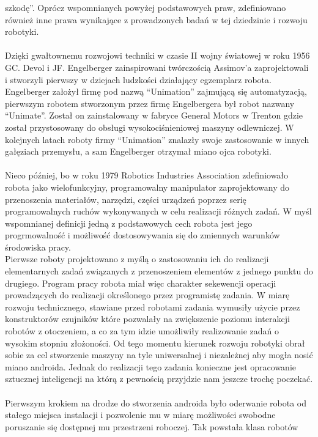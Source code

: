 szkodę''. Oprócz wspomnianych powyżej podstawowych praw, zdefiniowano również
inne prawa wynikające z prowadzonych badań w tej dziedzinie i rozwoju robotyki.\\
\\
Dzięki gwałtownemu rozwojowi techniki w czasie II wojny światowej w roku 1956
GC. Devol i JF. Engelberger zainspirowani twórczością Assimov'a zaprojektowali i
stworzyli pierwszy w dziejach ludzkości działający egzemplarz robota.
Engelberger założył firmę pod nazwą ``Unimation'' zajmującą się automatyzacją,
pierwszym robotem stworzonym przez firmę Engelbergera był robot nazwany
``Unimate''. Został on zainstalowany w fabryce General Motors w Trenton gdzie
został przystosowany do obsługi wysokociśnieniowej maszyny odlewniczej. W
kolejnych latach roboty firmy ``Unimation'' znalazły swoje zastosowanie w innych
gałęziach przemysłu, a sam Engelberger otrzymał miano ojca robotyki.\\
\\
Nieco później, bo w roku 1979 Robotics Industries Association 
zdefiniowało robota jako wielofunkcyjny, programowalny manipulator
zaprojektowany do przenoszenia materiałów, narzędzi, części urządzeń poprzez
serię programowalnych ruchów wykonywanych w celu realizacji różnych zadań.
W myśl wspomnianej definicji jedną z podstawowych cech robota jest jego
progrmowalność i możliwość dostosowywania się do zmiennych warunków środowiska
pracy. \\
Pierwsze roboty projektowano z myślą o zastosowaniu ich do realizacji
elementarnych zadań związanych z przenoszeniem elementów z jednego punktu do
drugiego. Program pracy robota miał więc charakter sekewencji operacji
prowadzących do realizacji określonego przez programistę zadania. W miarę
rozwoju technicznego, stawiane przed robotami zadania wymusiły użycie przez
konstruktorów czujników które pozwalały na zwiększenie poziomu interakcji
robotów z otoczeniem, a co za tym idzie umożliwiły realizowanie zadań o wysokim
stopniu złożoności. Od tego momentu kierunek rozwoju robotyki obrał
sobie za cel stworzenie maszyny na tyle uniwersalnej i niezależnej aby mogła
nosić miano androida. Jednak do realizacji tego zadania konieczne jest
opracowanie sztucznej inteligencji na którą z pewnością przyjdzie nam jeszcze
trochę poczekać. \\
\\
Pierwszym krokiem na drodze do stworzenia androida było oderwanie robota od
stałego miejsca instalacji i pozwolenie mu w miarę możliwości swobodne
poruszanie się dostępnej mu przestrzeni roboczej. Tak powstała klasa robotów
